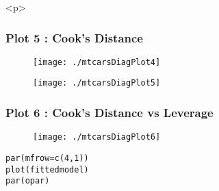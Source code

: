\documentclass[main.tex]{subfiles}
\begin{document}
<p>
\subsubsection{Plot 5 :  Cook's Distance}
\begin{figure}[h!]
\centering
\texttt{[image: ./mtcarsDiagPlot4]}

\label{mtcarsDiagPlot4}
\end{figure}


\begin{figure}[h!]
\centering
\texttt{[image: ./mtcarsDiagPlot5]}

\label{mtcarsDiagPlot5}
\end{figure}


\subsubsection{Plot 6 :  Cook's Distance vs Leverage}
\begin{figure}[h!]
\centering
\texttt{[image: ./mtcarsDiagPlot6]}

\label{mtcarsDiagPlot6}
\end{figure}


\begin{framed}
\begin{verbatim}
par(mfrow=c(4,1))
plot(fittedmodel)
par(opar)
\end{verbatim}
\end{framed}

\end{document}
